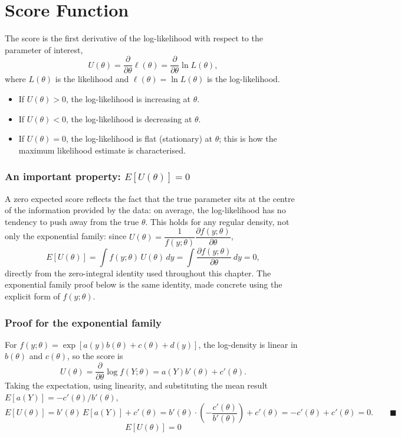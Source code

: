 \documentclass[12pt,a4paper]{report}
\begin{document}
\section{Score Function}

The score is the first derivative of the log-likelihood with respect to the parameter of interest,
\[
U(\theta) = \frac{\partial}{\partial \theta}\ell(\theta) = \frac{\partial}{\partial \theta}\ln L(\theta),
\]
where $L(\theta)$ is the likelihood and $\ell(\theta) = \ln L(\theta)$ is the log-likelihood.
\begin{itemize}[nosep]
  \item If $U(\theta) > 0$, the log-likelihood is increasing at $\theta$.
  \item If $U(\theta) < 0$, the log-likelihood is decreasing at $\theta$.
  \item If $U(\theta) = 0$, the log-likelihood is flat (stationary) at $\theta$; this is how the maximum likelihood estimate is characterised.
\end{itemize}

\subsubsection*{An important property: $E[U(\theta)] = 0$}

A zero expected score reflects the fact that the true parameter sits at the centre of the information provided by the data: on average, the log-likelihood has no tendency to push away from the true $\theta$. This holds for any regular density, not only the exponential family: since $U(\theta) = \dfrac{1}{f(y;\theta)}\dfrac{\partial f(y;\theta)}{\partial\theta}$,
\[
E[U(\theta)] = \int f(y;\theta)\,U(\theta)\, dy = \int \frac{\partial f(y;\theta)}{\partial \theta}\, dy = 0,
\]
directly from the zero-integral identity used throughout this chapter. The exponential family proof below is the same identity, made concrete using the explicit form of $f(y;\theta)$.

\subsubsection*{Proof for the exponential family}

For $f(y;\theta) = \exp[a(y)b(\theta)+c(\theta)+d(y)]$, the log-density is linear in $b(\theta)$ and $c(\theta)$, so the score is
\[
U(\theta) = \frac{\partial}{\partial\theta}\log f(Y;\theta) = a(Y)b'(\theta) + c'(\theta).
\]
Taking the expectation, using linearity, and substituting the mean result $E[a(Y)] = -c'(\theta)/b'(\theta)$,
\[
E[U(\theta)] = b'(\theta)\, E[a(Y)] + c'(\theta) = b'(\theta)\cdot\left(-\frac{c'(\theta)}{b'(\theta)}\right) + c'(\theta) = -c'(\theta) + c'(\theta) = 0. \qquad \blacksquare
\]
\[
\boxed{E[U(\theta)] = 0}
\]
\end{document}
